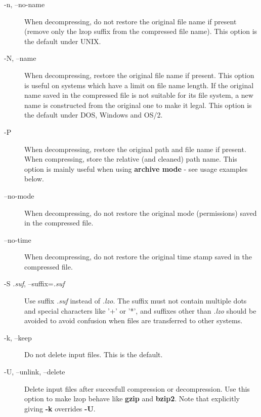 \begin{description}
\item[{-n, --no-name}] \mbox{}

When decompressing, do not restore the original
file name if present (remove only the lzop suffix
from the compressed file name). This option is the
default under UNIX.


\item[{-N, --name}] \mbox{}

When decompressing, restore the original file name
if present. This option is useful on systems which
have a limit on file name length. If the original name saved in
the compressed file is not suitable for its file system, a
new name is constructed from the original one to make it
legal.
This option is the default under DOS, Windows and OS/2.


\item[{-P}] \mbox{}

When decompressing, restore the original path and file name if present.
When compressing, store the relative (and cleaned) path name.
This option is mainly useful when using \textbf{archive mode} - see
usage examples below.


\item[{--no-mode}] \mbox{}

When decompressing, do not restore the original
mode (permissions) saved in the compressed file.


\item[{--no-time}] \mbox{}

When decompressing, do not restore the original
time stamp saved in the compressed file.


\item[{-S \textit{.suf}, --suffix=\textit{.suf}}] \mbox{}

Use suffix \textit{.suf} instead of \textit{.lzo}. The suffix must
not contain multiple dots and special characters like '+' or '*',
and suffixes other than \textit{.lzo} should be avoided to avoid confusion
when files are transferred to other systems.


\item[{-k, --keep}] \mbox{}

Do not delete input files. This is the default.


\item[{-U, --unlink, --delete}] \mbox{}

Delete input files after succesfull compression or
decompression. Use this option to make lzop behave
like \textbf{gzip} and \textbf{bzip2}.
Note that explicitly giving \textbf{-k} overrides \textbf{-U}.



\end{description}
